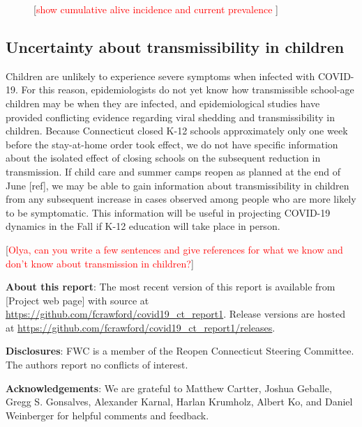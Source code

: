 \documentclass[11pt]{article}
\newcommand{\comment}[1]{[\textcolor{red}{#1}]}
\begin{document}
\begin{figure}
\centering
\caption{\comment{show cumulative alive incidence and current prevalence }}
\label{fig:cumincidence}
\end{figure}





\subsection*{Uncertainty about transmissibility in children}

Children are unlikely to experience severe symptoms when infected with COVID-19. For this reason, epidemiologists do not yet know how transmissible school-age children may be when they are infected, and epidemiological studies have provided conflicting evidence regarding viral shedding and transmissibility in children. Because Connecticut closed K-12 schools approximately only one week before the stay-at-home order took effect, we do not have specific information about the isolated effect of closing schools on the subsequent reduction in transmission.  If child care and summer camps reopen as planned at the end of June [ref], we may be able to gain information about transmissibility in children from any subsequent increase in cases observed among people who are more likely to be symptomatic.  This information will be useful in projecting COVID-19 dynamics in the Fall if K-12 education will take place in person. 


\comment{Olya, can you write a few sentences and give references for what we know and don't know about transmission in children?}




\textbf{About this report}: The most recent version of this report is available from [Project web page] with source at \url{https://github.com/fcrawford/covid19_ct_report1}. Release versions are hosted at \url{https://github.com/fcrawford/covid19_ct_report1/releases}. 



\textbf{Disclosures}: FWC is a member of the Reopen Connecticut Steering Committee.  The authors report no conflicts of interest. 



\textbf{Acknowledgements}: We are grateful to
Matthew Cartter,
Joshua Geballe,
Gregg S. Gonsalves,
Alexander Karnal,
Harlan Krumholz,
Albert Ko, 
and
Daniel Weinberger
for helpful comments and feedback. 





\end{document}
